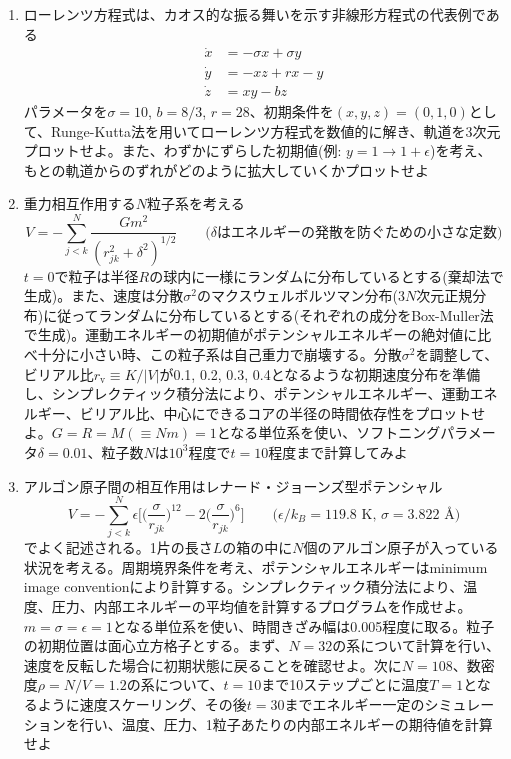 \documentclass[11pt]{jarticle}
\begin{document}
\begin{enumerate}
\item ローレンツ方程式は、カオス的な振る舞いを示す非線形方程式の代表例である
  \begin{align*}
    \dot{x} &= -\sigma x + \sigma y \\
    \dot{y} &= -xz + rx - y \\
    \dot{z} &= xy - bz
  \end{align*}
  パラメータを$\sigma=10$, $b=8/3$, $r=28$、初期条件を$(x,y,z)=(0,1,0)$として、Runge-Kutta法を用いてローレンツ方程式を数値的に解き、軌道を3次元プロットせよ。また、わずかにずらした初期値(例: $y=1 \rightarrow 1+\epsilon$)を考え、もとの軌道からのずれがどのように拡大していくかプロットせよ

\item 重力相互作用する$N$粒子系を考える
  \[
  V = - \sum_{j<k}^N \frac{Gm^2}{(r_{jk}^2 + \delta^2)^{1/2}} \qquad \text{($\delta$はエネルギーの発散を防ぐための小さな定数)}
  \]
  $t=0$で粒子は半径$R$の球内に一様にランダムに分布しているとする(棄却法で生成)。また、速度は分散$\sigma^2$のマクスウェルボルツマン分布($3N$次元正規分布)に従ってランダムに分布しているとする(それぞれの成分をBox-Muller法で生成)。運動エネルギーの初期値がポテンシャルエネルギーの絶対値に比べ十分に小さい時、この粒子系は自己重力で崩壊する。分散$\sigma^2$を調整して、ビリアル比$r_\text{v} \equiv K/|V|$が0.1, 0.2, 0.3, 0.4となるような初期速度分布を準備し、シンプレクティック積分法により、ポテンシャルエネルギー、運動エネルギー、ビリアル比、中心にできるコアの半径の時間依存性をプロットせよ。$G=R=M(\equiv Nm)=1$となる単位系を使い、ソフトニングパラメータ$\delta=0.01$、粒子数$N$は$10^3$程度で$t=10$程度まで計算してみよ

\item アルゴン原子間の相互作用はレナード・ジョーンズ型ポテンシャル
  \[
  V = - \sum_{j<k}^N \epsilon \Big[\Big(\frac{\sigma}{r_{jk}}\Big)^{12} - 2 \Big(\frac{\sigma}{r_{jk}}\Big)^6\Big] \qquad \text{($\epsilon / k_B = 119.8$ K, $\sigma = 3.822$ \AA)}
  \]
  でよく記述される。1片の長さ$L$の箱の中に$N$個のアルゴン原子が入っている状況を考える。周期境界条件を考え、ポテンシャルエネルギーはminimum image conventionにより計算する。シンプレクティック積分法により、温度、圧力、内部エネルギーの平均値を計算するプログラムを作成せよ。$m=\sigma=\epsilon=1$となる単位系を使い、時間きざみ幅は0.005程度に取る。粒子の初期位置は面心立方格子とする。まず、$N=32$の系について計算を行い、速度を反転した場合に初期状態に戻ることを確認せよ。次に$N=108$、数密度$\rho=N/V=1.2$の系について、$t=10$まで10ステップごとに温度$T=1$となるように速度スケーリング、その後$t=30$までエネルギー一定のシミュレーションを行い、温度、圧力、1粒子あたりの内部エネルギーの期待値を計算せよ


\end{enumerate}
\end{document}
